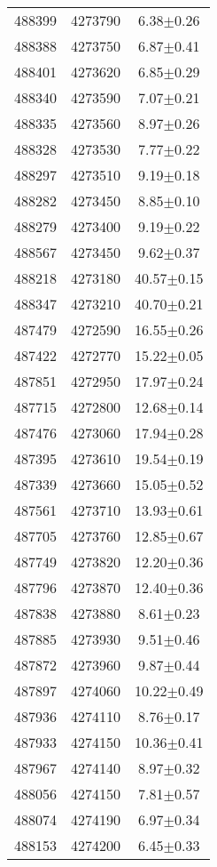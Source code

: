 \begin{center}
\begin{supertabular}{c c c}
488399	 & 	4273790	 & 	6.38$\pm$0.26\\ 
488388	 & 	4273750	 & 	6.87$\pm$0.41\\ 
488401	 & 	4273620	 & 	6.85$\pm$0.29\\ 
488340	 & 	4273590	 & 	7.07$\pm$0.21\\ 
488335	 & 	4273560	 & 	8.97$\pm$0.26\\ 
488328	 & 	4273530	 & 	7.77$\pm$0.22\\ 
488297	 & 	4273510	 & 	9.19$\pm$0.18\\ 
488282	 & 	4273450	 & 	8.85$\pm$0.10\\ 
488279	 & 	4273400	 & 	9.19$\pm$0.22\\ 
488567	 & 	4273450	 & 	9.62$\pm$0.37\\ 
488218	 & 	4273180	 & 	40.57$\pm$0.15\\ 
488347	 & 	4273210	 & 	40.70$\pm$0.21\\ 
487479	 & 	4272590	 & 	16.55$\pm$0.26\\ 
487422	 & 	4272770	 & 	15.22$\pm$0.05\\ 
487851	 & 	4272950	 & 	17.97$\pm$0.24\\ 
487715	 & 	4272800	 & 	12.68$\pm$0.14\\ 
487476	 & 	4273060	 & 	17.94$\pm$0.28\\ 
487395	 & 	4273610	 & 	19.54$\pm$0.19\\ 
487339	 & 	4273660	 & 	15.05$\pm$0.52\\ 
487561	 & 	4273710	 & 	13.93$\pm$0.61\\ 
487705	 & 	4273760	 & 	12.85$\pm$0.67\\ 
487749	 & 	4273820	 & 	12.20$\pm$0.36\\ 
487796	 & 	4273870	 & 	12.40$\pm$0.36\\ 
487838	 & 	4273880	 & 	8.61$\pm$0.23\\ 
487885	 & 	4273930	 & 	9.51$\pm$0.46\\ 
487872	 & 	4273960	 & 	9.87$\pm$0.44\\ 
487897	 & 	4274060	 & 	10.22$\pm$0.49\\ 
487936	 & 	4274110	 & 	8.76$\pm$0.17\\ 
487933	 & 	4274150	 & 	10.36$\pm$0.41\\ 
487967	 & 	4274140	 & 	8.97$\pm$0.32\\ 
488056	 & 	4274150	 & 	7.81$\pm$0.57\\ 
488074	 & 	4274190	 & 	6.97$\pm$0.34\\ 
488153	 & 	4274200	 & 	6.45$\pm$0.33\\ 

\end{supertabular}
\end{center}
